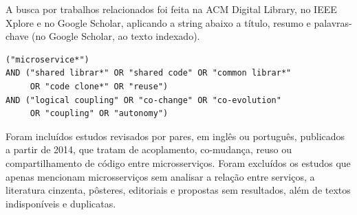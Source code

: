 \label{ap:busca}

A busca por trabalhos relacionados foi feita na ACM Digital Library, no IEEE Xplore e no Google Scholar, aplicando a string abaixo a título, resumo e palavras-chave (no Google Scholar, ao texto indexado).

\begin{verbatim}
("microservice*")
AND ("shared librar*" OR "shared code" OR "common librar*"
     OR "code clone*" OR "reuse")
AND ("logical coupling" OR "co-change" OR "co-evolution"
     OR "coupling" OR "autonomy")
\end{verbatim}

Foram incluídos estudos revisados por pares, em inglês ou português, publicados a partir de 2014, que tratam de acoplamento, co-mudança, reuso ou compartilhamento de código entre microsserviços. Foram excluídos os estudos que apenas mencionam microsserviços sem analisar a relação entre serviços, a literatura cinzenta, pôsteres, editoriais e propostas sem resultados, além de textos indisponíveis e duplicatas.
